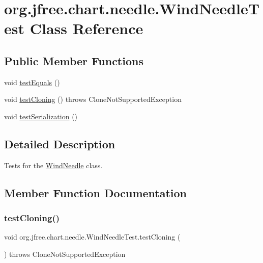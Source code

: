 \hypertarget{classorg_1_1jfree_1_1chart_1_1needle_1_1_wind_needle_test}{}\section{org.\+jfree.\+chart.\+needle.\+Wind\+Needle\+Test Class Reference}
\label{classorg_1_1jfree_1_1chart_1_1needle_1_1_wind_needle_test}
\subsection*{Public Member Functions}
\begin{DoxyCompactItemize}
\item 
void \mbox{\hyperlink{classorg_1_1jfree_1_1chart_1_1needle_1_1_wind_needle_test_a04deb5268361e32474434a9eeb0656c6}{test\+Equals}} ()
\item 
void \mbox{\hyperlink{classorg_1_1jfree_1_1chart_1_1needle_1_1_wind_needle_test_a037480b1019a605baccaf0a2d3f31e4d}{test\+Cloning}} ()  throws Clone\+Not\+Supported\+Exception 
\item 
void \mbox{\hyperlink{classorg_1_1jfree_1_1chart_1_1needle_1_1_wind_needle_test_a950c80c48263d136d51eaf2f3f96d2e9}{test\+Serialization}} ()
\end{DoxyCompactItemize}


\subsection{Detailed Description}
Tests for the \mbox{\hyperlink{classorg_1_1jfree_1_1chart_1_1needle_1_1_wind_needle}{Wind\+Needle}} class. 

\subsection{Member Function Documentation}
\mbox{\label{classorg_1_1jfree_1_1chart_1_1needle_1_1_wind_needle_test_a037480b1019a605baccaf0a2d3f31e4d}} 
\subsubsection{\texorpdfstring{test\+Cloning()}{testCloning()}}
{\footnotesize\ttfamily void org.\+jfree.\+chart.\+needle.\+Wind\+Needle\+Test.\+test\+Cloning (\begin{DoxyParamCaption}{ }\end{DoxyParamCaption}) throws Clone\+Not\+Supported\+Exception}

